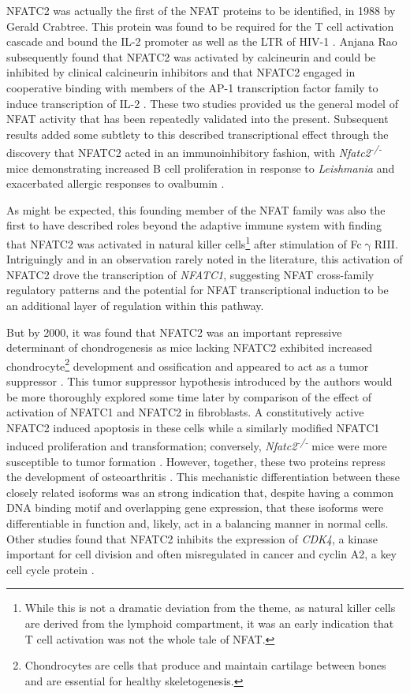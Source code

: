 NFATC2 was actually the first of the NFAT proteins to be identified, in 1988 by Gerald Crabtree. This protein was found to be required for the T cell activation cascade and bound the IL\hyp{}2 promoter as well as the LTR of HIV\hyp{}1 \citep{Shaw1988}. Anjana Rao subsequently found that NFATC2 was activated by calcineurin and could be inhibited by clinical calcineurin inhibitors and that NFATC2 engaged in cooperative binding with members of the AP\hyp{}1 transcription factor family to induce transcription of IL\hyp{}2 \citep{Jain1993}. These two studies provided us the general model of NFAT activity that has been repeatedly validated into the present. Subsequent results added some subtlety to this described transcriptional effect through the discovery that NFATC2 acted in an immunoinhibitory fashion, with \textit{Nfatc2\textsuperscript{\hyp{}/\hyp{}}} mice demonstrating increased B cell proliferation in response to \textit{Leishmania} and exacerbated allergic responses to ovalbumin \citep{Xanthoudakis1996}. 

As might be expected, this founding member of the NFAT family was also the first to have described roles beyond the adaptive immune system with \citet{Aramburu1995} finding that NFATC2 was activated in natural killer cells\footnote{While this is not a dramatic deviation from the theme, as natural killer cells are derived from the lymphoid compartment, it was an early indication that T cell activation was not the whole tale of NFAT.} after stimulation of Fc$\upgamma$RIII. Intriguingly and in an observation rarely noted in the literature, this activation of NFATC2 drove the transcription of \textit{NFATC1}, suggesting NFAT cross\hyp{}family regulatory patterns and the potential for NFAT transcriptional induction to be an additional layer of regulation within this pathway.

But by 2000, it was found that NFATC2 was an important repressive determinant of chondrogenesis as mice lacking NFATC2 exhibited increased chondrocyte\footnote{Chondrocytes are cells that produce and maintain cartilage between bones and are essential for healthy skeletogenesis.} development and ossification and appeared to act as a tumor suppressor \citep{Ranger2000}. This tumor suppressor hypothesis introduced by the authors would be more thoroughly explored some time later by comparison of the effect of activation of NFATC1 and NFATC2 in fibroblasts. A constitutively active NFATC2 induced apoptosis in these cells while a similarly modified NFATC1 induced proliferation and transformation; conversely, \textit{Nfatc2\textsuperscript{\hyp{}/\hyp{}}} mice were more susceptible to tumor formation \citep{Robbs2008}. However, together, these two proteins repress the development of osteoarthritis \citep{Greenblatt2013}. This mechanistic differentiation between these closely related isoforms was an strong indication that, despite having a common DNA binding motif and overlapping gene expression, that these isoforms were differentiable in function and, likely, act in a balancing manner in normal cells. Other studies found that NFATC2 inhibits the expression of \textit{CDK4}, a kinase important for cell division and often misregulated in cancer \citep{Baksh2002, OLeary2016} and cyclin A2, a key cell cycle protein \citep{Carvalho2007}.    

